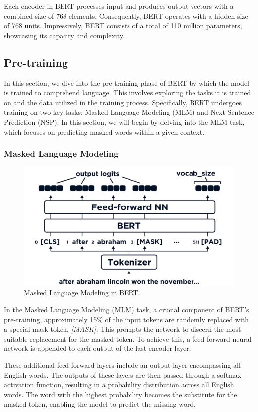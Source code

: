 \documentclass[a4paper,10pt]{report} %
\begin{document}
Each encoder in BERT processes input and produces output vectors with a combined size of 768 elements. Consequently, BERT operates with a hidden size of 768 units. Impressively, BERT consists of a total of 110 million parameters, showcasing its capacity and complexity. \cite{bert}


\subsection{Pre-training}
In this section, we dive into the pre-training phase of BERT by which the model is trained to comprehend language. This involves exploring the tasks it is trained on and the data utilized in the training process. Specifically, BERT undergoes training on two key tasks: Masked Language Modeling (MLM) and Next Sentence Prediction (NSP). In this section, we will begin by delving into the MLM task, which focuses on predicting masked words within a given context.

\subsubsection{Masked Language Modeling}
\begin{figure}
  \centering
  \includegraphics[width=12cm]{img/mlm_bert.png}
  \caption{Masked Language Modeling in BERT. \cite{bertMLM}}
  \label{fig:mlm_bert}
\end{figure}
In the Masked Language Modeling (MLM) task, a crucial component of BERT's pre-training, approximately 15\% of the input tokens are randomly replaced with a special mask token, \textit{[MASK]}. This prompts the network to discern the most suitable replacement for the masked token. To achieve this, a feed-forward neural network is appended to each output of the last encoder layer.

These additional feed-forward layers include an output layer encompassing all English words. The outputs of these layers are then passed through a softmax activation function, resulting in a probability distribution across all English words. The word with the highest probability becomes the substitute for the masked token, enabling the model to predict the missing word.
\end{document}
